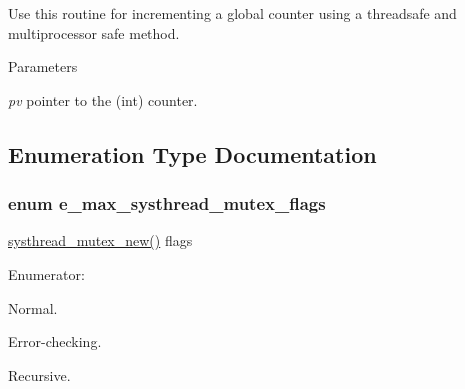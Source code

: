 Use this routine for incrementing a global counter using a threadsafe and multiprocessor safe method. 
\begin{DoxyParams}{Parameters}
\item[{\em pv}]pointer to the (int) counter. \end{DoxyParams}


\subsection{Enumeration Type Documentation}
\hypertarget{group__threading_gaa95d9c538a1b25404d19106739db9802}{
\subsubsection[{e\_\-max\_\-systhread\_\-mutex\_\-flags}]{\setlength{\rightskip}{0pt plus 5cm}enum {\bf e\_\-max\_\-systhread\_\-mutex\_\-flags}}}
\label{group__threading_gaa95d9c538a1b25404d19106739db9802}


\hyperlink{group__mutex_gaa8cae78764c59883566ac4f861dd534e}{systhread\_\-mutex\_\-new()} flags \begin{Desc}
\item[Enumerator: ]\par
\begin{description}
\item[{\em 
\hypertarget{group__threading_ggaa95d9c538a1b25404d19106739db9802ae34f8741b28ee92a4d702bee8671bb32}{
SYSTHREAD\_\-MUTEX\_\-NORMAL}
\label{group__threading_ggaa95d9c538a1b25404d19106739db9802ae34f8741b28ee92a4d702bee8671bb32}
}]Normal. \item[{\em 
\hypertarget{group__threading_ggaa95d9c538a1b25404d19106739db9802abb3854e7bf495808b4251d1319cdfa45}{
SYSTHREAD\_\-MUTEX\_\-ERRORCHECK}
\label{group__threading_ggaa95d9c538a1b25404d19106739db9802abb3854e7bf495808b4251d1319cdfa45}
}]Error-\/checking. \item[{\em 
\hypertarget{group__threading_ggaa95d9c538a1b25404d19106739db9802a4fa486d028b3153aac389ed24e63dddb}{
SYSTHREAD\_\-MUTEX\_\-RECURSIVE}
\label{group__threading_ggaa95d9c538a1b25404d19106739db9802a4fa486d028b3153aac389ed24e63dddb}
}]Recursive. \end{description}
\end{Desc}



